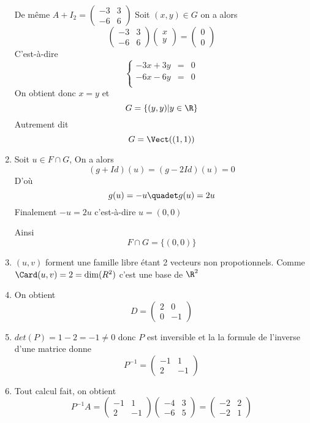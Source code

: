 \documentclass[a4paper, 11pt,reqno]{article}
\begin{document}
\begin{correction}
\begin{enumerate}
De même
$A+I_2 = \begin{pmatrix}
-3 & 3\\
-6 & 6
\end{pmatrix}$
Soit $(x,y) \in G$ on a alors 
$$\begin{pmatrix}
-3 & 3\\
-6 & 6
\end{pmatrix} \begin{pmatrix}
x\\
y
\end{pmatrix}=\begin{pmatrix}
0\\
0
\end{pmatrix}$$
C'est-à-dire 
$$\left\{ 
\begin{array}{ccc}
-3x+3y &=&0\\
-6x-6y &=&0\\
\end{array}
\right.$$
On obtient donc $x=y$ et 
$$G= \{ (y,y) | y\in \R\} $$
Autrement dit 
$$G =\Vect((1,1))$$

\item Soit $u \in F\cap G$, 
On a alors 
$$(g+Id)(u) = (g-2Id)(u) = 0$$
D'où
$$g(u)=-u \quadet g(u)=2u$$
Finalement 
$-u=2u$ c'est-à-dire $u=(0,0)$

Ainsi 
$$F\cap G =\{ (0,0)\}$$

\item $(u,v)$ forment une famille libre étant 2 vecteurs non propotionnels. Comme $\Card(u,v) =2 =\dim(R^2)$ c'est une base de $\R^2$
\item On obtient 
$$D=\begin{pmatrix}
2&0\\
0& -1
\end{pmatrix}$$
\item $det(P) = 1-2= -1\neq 0$ donc $P$ est inversible et la 
la formule de l'inverse d'une matrice donne 
$$P^{-1} = \begin{pmatrix}
-1 & 1\\
2 & -1
\end{pmatrix}$$

\item Tout calcul fait, on obtient 
$$P^{-1} A =\begin{pmatrix}
-1 & 1\\
2 & -1
\end{pmatrix}  \begin{pmatrix}
-4 &3\\
-6 & 5
\end{pmatrix} = \begin{pmatrix}
-2&2\\
-2& 1
\end{pmatrix}$$



\end{enumerate}
\end{correction}
\end{document}
